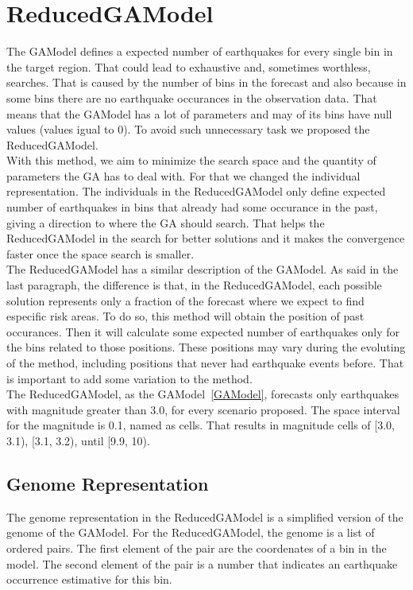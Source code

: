 \section{ReducedGAModel}\label{ReducedGAModel}
The GAModel defines a expected number of earthquakes for every single bin in the target region. That could lead to exhaustive and, sometimes worthless, searches. That is caused by the number of bins in the forecast and also because in some bins there are no earthquake occurances in the observation data. That means that the GAModel has a lot of parameters and may of its bins have null values (values igual to 0). To avoid such unnecessary task we proposed the ReducedGAModel.\\

With this method, we aim to minimize the search space and the quantity of parameters the GA has to deal with. For that we changed the individual representation. The individuals in the ReducedGAModel only define expected number of earthquakes in bins that already had some occurance in the past, giving a direction to where the GA should search. That helps the ReducedGAModel in the search for better solutions and it makes the convergence faster once the space search is smaller.\\

The ReducedGAModel has a similar description of the GAModel. As said in the last paragraph, the difference is that, in the ReducedGAModel, each possible solution represents only a fraction of the forecast where we expect to find especific risk areas. To do so, this method will obtain the position of past occurances. Then it will calculate some expected number of earthquakes only for the bins related to those positions. These positions may vary during the evoluting of the method, including positions that never had earthquake events before. That is important to add some variation to the method.\\

The ReducedGAModel, as the GAModel~\ref{GAModel}, forecasts only earthquakes with magnitude greater than 3.0, for every scenario proposed. The space interval for the magnitude is 0.1, named as cells. That results in magnitude cells of [3.0, 3.1), [3.1, 3.2), until [9.9, 10).\\

\subsection{Genome Representation}\label{genomeReduced}
The genome representation in the ReducedGAModel is a simplified version of the genome of the GAModel. For the ReducedGAModel, the genome is a list of ordered pairs. The first element of the pair are the coordenates of a bin in the model. The second element of the pair is a number that indicates an earthquake occurrence estimative for this bin.\\


